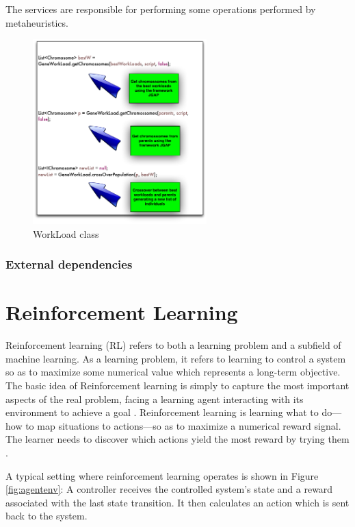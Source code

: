 \documentclass{report}
\begin{document}
The services are responsible for performing some operations performed by metaheuristics.

\begin{figure}[!h]
\centering
\includegraphics[width=0.6\textwidth]{./images/operationservice.png}
\caption{WorkLoad class}
\label{fig:emulator}
\end{figure}

\subsection{External dependencies}


\chapter{Reinforcement Learning}

Reinforcement learning (RL) refers to both a learning problem and a subfield of machine learning. As a learning problem, it refers to learning to control a system so as to maximize some numerical value which represents a long-term objective. The basic idea of Reinforcement learning  is simply to capture the most important aspects of the real problem, facing a learning agent interacting with its environment to achieve a goal \cite{Sutton2012}. Reinforcement learning is learning what to do—how to map situations to actions—so as to maximize a numerical reward signal. The learner needs to discover which actions yield the most reward by trying them \cite{Sutton2012}.

A typical setting where
reinforcement learning operates is shown in Figure \ref{fig:agentenv}: A controller receives the controlled
system’s state and a reward associated with the last state transition. It then calculates an
action which is sent back to the system.
\end{document}
